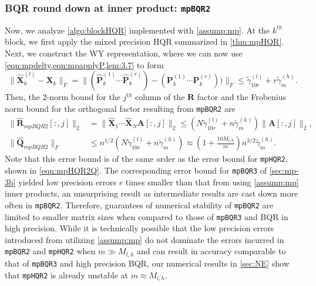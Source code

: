 \documentclass[review,onefignum,onetabnum]{siamart190516}
\newcommand{\bb}[1]{\mathbf{#1}}
\newcommand{\cO}{\mathcal{O}}
\begin{document}
\subsubsection{BQR round down at inner product: {\tt mpBQR2}}
Now, we analyze \cref{algo:blockHQR} implemented with \cref{assump:mp}. 
At the $k^{th}$ block, we first apply the mixed precision HQR summarized in \cref{thm:mpHQR}.
Next, we construct the WY representation, where we can now use \cref{eqn:mpdelty,eqn:mpapplyP,lem:3.7} to form
\begin{equation}
\|\hat{\bb{X}}_{k}^{(l)}- \bb{X}_k\|_F = \|(\hat{\bb{P}}_k^{(1)}\cdots \hat{\bb{P}}_k^{(r)})-(\bb{P}_k^{(1)}\cdots \bb{P}_k^{(r)}))\|_F \leq \tilde{\gamma}_{10r}^{(l)} + r\tilde{\gamma}_{m}^{(h)}.
\end{equation}
Then, the 2-norm bound for the $j^{th}$ column of the $\bb{R}$ factor and the Frobenius norm bound for the orthogonal factor resulting from {\tt mpBQR2} are
\begin{align}
\|\hat{\bb{R}}_{mpBQR2}[:,j]\|_2 &= \|\hat{\bb{X}}_1\cdots\hat{\bb{X}}_N\bb{A}[:,j]\|_2\leq\left( N\tilde{\gamma}_{10r}^{(l)} + n\tilde{\gamma}_{m}^{(h)}\right)\|\bb{A}[:,j]\|_2,\\
\|\hat{\bb{Q}}_{mpBQR2}\|_F &\leq n^{1/2}\left(N\tilde{\gamma}_{10r}^{(l)} + n\tilde{\gamma}_{m}^{(h)}\right) \approx \left(1+\frac{10M_{l,h}}{m}\right)n^{3/2}\tilde{\gamma}_{m}^{(h)}. \label{eqn:mpBQR2}
\end{align}
Note that this error bound is of the same order as the error bound for {\tt mpHQR2}, shown in \cref{eqn:mpHQR2Q}.
The corresponding error bound for {\tt mpBQR3} of \cref{sec:mp-3b} yielded low precision errors $r$ times smaller than that from 
using \cref{assump:mp} inner products, an unsurprising result as intermediate results are cast down more often in {\tt mpBQR2}.
Therefore, guarantees of numerical stability of {\tt mpBQR2} are limited to smaller matrix sizes when compared to those of {\tt mpBQR3} and BQR in high precision.
While it is technically possible that the low precision errors introduced from utilizing \cref{assump:mp} do not dominate the errors incurred in {\tt mpBQR2} and {\tt mpHQR2} when $m\gg M_{l,h}$ and can result in accuracy comparable to that of {\tt mpBQR3} and high precision BQR, our numerical results in \cref{sec:NE} show that {\tt mpHQR2} is already unstable at $m\approx M_{l,h}$.
\end{document}
